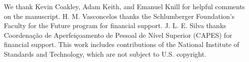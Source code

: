\documentclass[
reprint,
superscriptaddress,
showpacs,
amsmath,
amssymb,
aps,
pra,
longbibliography
]{revtex4-1}
\begin{document}
\begin{acknowledgments}
We thank Kevin Coakley, Adam Keith, and Emanuel Knill for helpful
comments on the manuscript.  H. M. Vasconcelos thanks the Schlumberger 
Foundation's Faculty for the Future program for financial support. J. L. E. Silva thanks Coordena\c c\~ao de Aperfei\c coamento de Pessoal de N\'ivel Superior (CAPES) for financial support. This work includes contributions of the National Institute of Standards and
Technology, which are not subject to U.S. copyright.
\end{acknowledgments}




%


\end{document}
